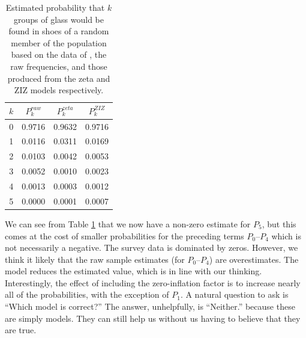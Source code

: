 \documentclass{article}\usepackage[]{graphicx}\usepackage[]{xcolor}
\begin{document}
\begin{table}[ht]
\centering
\begin{tabular}{cccc}
  \hline
$k$ & $P_k^{raw}$ & $P_k^{zeta}$ & $P_k^{ZIZ}$ \\ 
  \hline
0 & 0.9716 & 0.9632 & 0.9716 \\ 
  1 & 0.0116 & 0.0311 & 0.0169 \\ 
  2 & 0.0103 & 0.0042 & 0.0053 \\ 
  3 & 0.0052 & 0.0010 & 0.0023 \\ 
  4 & 0.0013 & 0.0003 & 0.0012 \\ 
  5 & 0.0000 & 0.0001 & 0.0007 \\ 
   \hline
\end{tabular}
\caption{Estimated probability that $k$ groups of glass would be found in shoes of a random member of the population based on the data of \citep{roux2001}, the raw frequencies, and those produced from the zeta and ZIZ models respectively.} 
\label{tab:ex1}
\end{table}

We can see from Table \ref{tab:ex1} that we now have a non-zero estimate for $P_5$,
but this comes at the cost of smaller probabilities for the preceding terms $P_0$--$P_4$ which is not necessarily a negative. The survey data is dominated by zeros. However, we think it likely that the raw sample estimates (for $P_0$--$P_4$) are overestimates. The model reduces the estimated value, which is in line with our thinking. Interestingly, the effect of including the zero-inflation factor is to increase nearly all of the probabilities, with the exception of $P_1$. A natural question to ask is ``Which model is correct?'' The answer, unhelpfully, is ``Neither.'' because these are simply models. They can still help us without us having to believe that they are true.
\end{document}
